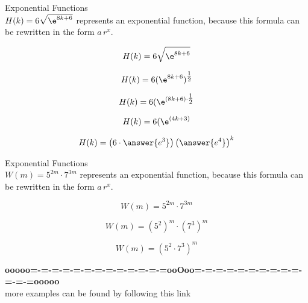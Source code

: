 \documentclass{ximera}
\begin{document}
\begin{example}  Exponential Functions \\



$H(k) = 6 \sqrt{\e^{8 k + 6}} $ represents an exponential function, because this formula can be rewritten in the form $a \, r^x$.   \\


\begin{explanation}


\[
H(k) = 6 \sqrt{\e^{8 k + 6}}
\]


\[
H(k) = 6 (\e^{8 k + 6})^{\tfrac{1}{2}}
\]

\[
H(k) = 6 (\e^{(8 k + 6) \cdot \tfrac{1}{2}}
\]

\[
H(k) = 6 (\e^{(4 k + 3)}
\]

\[
H(k) = \left( 6 \cdot \answer{e^3} \right) \left( \answer{e^4} \right)^k
\]


\end{explanation}

\end{example}

















\begin{example}  Exponential Functions \\



$W(m) = 5^{2 m} \cdot 7^{3 m}$ represents an exponential function, because this formula can be rewritten in the form $a \, r^x$.   \\


\begin{explanation}


\[
W(m) = 5^{2 m} \cdot 7^{3 m}
\]


\[
W(m) = \left( 5^2 \right)^m \cdot \left( 7^3 \right)^m
\]

\[
W(m) = \left( 5^2 \cdot 7^3 \right)^m 
\]




\end{explanation}

\end{example}









\begin{center}
\textbf{\textcolor{green!50!black}{ooooo=-=-=-=-=-=-=-=-=-=-=-=-=ooOoo=-=-=-=-=-=-=-=-=-=-=-=-=ooooo}} \\

more examples can be found by following this link\\ 

\end{center}
\end{document}
